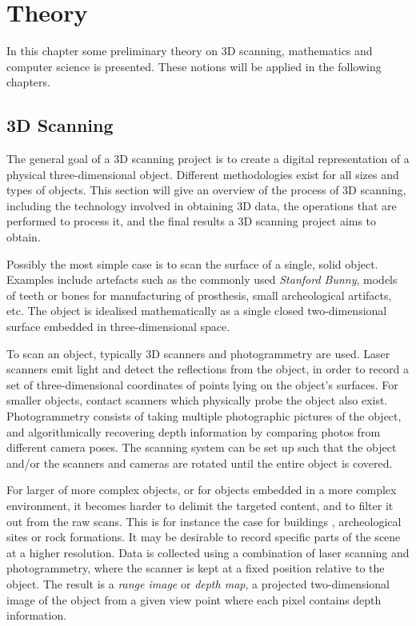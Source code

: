 \chapter{Theory} \label{ch:theory}
In this chapter some preliminary theory on 3D scanning, mathematics and computer science is presented. These notions will be applied in the following chapters.

\section{3D Scanning}
The general goal of a 3D scanning project is to create a digital representation of a physical three-dimensional object. Different methodologies exist for all sizes and types of objects. This section will give an overview of the process of 3D scanning, including the technology involved in obtaining 3D data, the operations that are performed to process it, and the final results a 3D scanning project aims to obtain.

Possibly the most simple case is to scan the surface of a single, solid object. Examples include artefacts such as the commonly used \emph{Stanford Bunny}, models of teeth or bones for manufacturing of prosthesis, small archeological artifacts, etc. The object is idealised mathematically as a single closed two-dimensional surface embedded in three-dimensional space.

To scan an object, typically 3D scanners and photogrammetry are used. Laser scanners emit light and detect the reflections from the object, in order to record a set of three-dimensional coordinates of points lying on the object's surfaces. For smaller objects, contact scanners which physically probe the object also exist. Photogrammetry consists of taking multiple photographic pictures of the object, and algorithmically recovering depth information by comparing photos from different camera poses. The scanning system can be set up such that the object and/or the scanners and cameras are rotated until the entire object is covered.

For larger of more complex objects, or for objects embedded in a more complex environment, it becomes harder to delimit the targeted content, and to filter it out from the raw scans. This is for instance the case for buildings \cite{Kers2006}, archeological sites \cite{Kein2011} \cite{Grus2012} or rock formations. It may be desirable to record specific parts of the scene at a higher resolution. Data is collected using a combination of laser scanning and photogrammetry, where the scanner is kept at a fixed position relative to the object. The result is a \emph{range image} or \emph{depth map}, a projected two-dimensional image of the object from a given view point where each pixel contains depth information.

